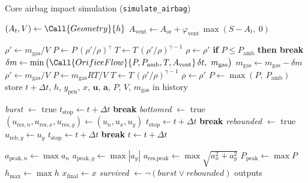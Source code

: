 \begin{algobox}[label=alg:simulate_airbag]{Core airbag impact simulation (\texttt{simulate\_airbag})}
\begin{algorithmic}[1]
  \State $(A_t, V) \gets \Call{Geometry}{h}$ 
  \State $A_\text{vent} \gets A_\text{or} + \varphi_\text{vent}\,\max(S - A_t,\ 0)$ 

  \State $\rho' \gets m_\text{gas}/V$
  \State $P \gets P\,(\rho'/\rho)^{\gamma}$ 
  \State $T \gets T\,(\rho'/\rho)^{\gamma-1}$
  \State $\rho \gets \rho'$
   
    \State \textbf{if} $P \le P_\text{amb}$ \textbf{then break}
    \State $\delta m \gets \min\big(\Call{OrificeFlow}{P, P_\text{amb}, T, A_\text{vent}}\,\delta t,\ m_\text{gas}\big)$
    \State $m_\text{gas} \gets m_\text{gas} - \delta m$
    \State $\rho' \gets m_\text{gas}/V$
    \State $P \gets m_\text{gas} R T/V$
    \State $T \gets T\,(\rho'/\rho)^{\gamma-1}$
    \State $\rho \gets \rho'$
  \EndFor
  \State $P \gets \max(P,\ P_\text{amb})$
  \State store $t+\Delta t$, $h$, $y_\text{pen}$, $x$, $\mathbf{u}$, $\mathbf{a}$, $P$, $V$, $m_\text{gas}$ in history

   
    \State \textit{burst} $\gets$ true
    \State $t_\text{stop} \gets t + \Delta t$
    \State \textbf{break}
   
    \State \textit{bottomed} $\gets$ true
    \State $(u_{\text{res},n}, u_{\text{res},x}, u_{\text{res},y}) \gets (u_n, u_x, u_y)$
    \State $t_\text{stop} \gets t + \Delta t$
    \State \textbf{break}
   
    \State \textit{rebounded} $\gets$ true
    \State $u_{\text{reb},y} \gets u_y$
    \State $t_\text{stop} \gets t + \Delta t$
    \State \textbf{break}
  \EndIf
  \State $t \gets t + \Delta t$
\EndWhile {}

\State $a_{\text{peak},n} \gets \max a_n$ 
\State $a_{\text{peak},y} \gets \max|a_y|$
\State $a_\text{res,peak} \gets \max\sqrt{a_x^2 + a_y^2}$
\State $P_\text{peak} \gets \max P$
\State $h_\text{max} \gets \max h$
\State $x_\text{final} \gets x$
\State \textit{survived} $\gets \lnot(\textit{burst} \lor \textit{rebounded})$
\State \Return outputs
\end{algorithmic}
\end{algobox}

